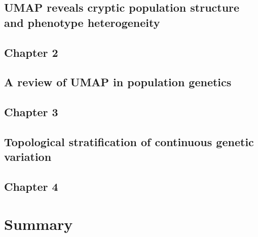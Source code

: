 \documentclass[12pt, TexShade, letterpaper]{report}
\makeatletter
\newcommand{\unchapter}[1]{%
  \begingroup
  \let\@makechapterhead\@gobble %
  \chapter{#1}
  \endgroup
}
\makeatother
\begin{document}
\vfill
\hspace{0pt}
\pagebreak


\begin{refsection}
\unchapter{UMAP reveals cryptic population structure and phenotype heterogeneity}
\chapter*{Chapter 2}
\label{chap:chapter2}


\begin{singlespace}
\printbibliography[heading=subbibintoc]
\end{singlespace}
\end{refsection}

\begin{refsection}
\unchapter{A review of UMAP in population genetics}
\chapter*{Chapter 3}
\label{chap:chapter3}


\begin{singlespace}
\printbibliography[heading=subbibintoc]
\end{singlespace}
\end{refsection}

\begin{refsection}
\unchapter{Topological stratification of continuous genetic variation}
\chapter*{Chapter 4}
\label{chap:chapter4}


\begin{singlespace}
\printbibliography[heading=subbibintoc]
\end{singlespace}
\end{refsection}

%
%

\part{Summary}
\label{part:conclusion}
\end{document}
